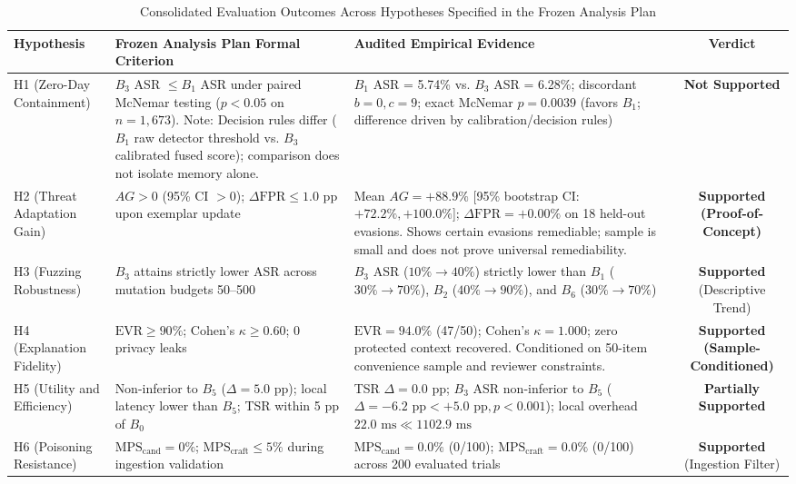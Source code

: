 \documentclass[conference]{IEEEtran}
\begin{document}
\begin{table}[t]
\centering
\caption{Consolidated Evaluation Outcomes Across Hypotheses Specified in the Frozen Analysis Plan}
\label{tab:hypotheses_summary}
\begin{tabular}{l p{5.2cm} p{7.3cm} c}
\hline
\textbf{Hypothesis} & \textbf{Frozen Analysis Plan Formal Criterion} & \textbf{Audited Empirical Evidence} & \textbf{Verdict} \\
\hline
H1 (Zero-Day Containment) & $B_3$ ASR $\le B_1$ ASR under paired McNemar testing ($p < 0.05$ on $n=1,673$). Note: Decision rules differ ($B_1$ raw detector threshold vs. $B_3$ calibrated fused score); comparison does not isolate memory alone. & $B_1$ ASR = 5.74\% vs. $B_3$ ASR = 6.28\%; discordant $b=0, c=9$; exact McNemar $p = 0.0039$ (favors $B_1$; difference driven by calibration/decision rules) & \textbf{Not Supported} \\
H2 (Threat Adaptation Gain) & $AG > 0$ (95\% CI $> 0$); $\Delta\text{FPR} \le 1.0\text{ pp}$ upon exemplar update & Mean $AG = +88.9\%$ [95\% bootstrap CI: $+72.2\%, +100.0\%$]; $\Delta\text{FPR} = +0.00\%$ on 18 held-out evasions. Shows certain evasions remediable; sample is small and does not prove universal remediability. & \textbf{Supported (Proof-of-Concept)} \\
H3 (Fuzzing Robustness) & $B_3$ attains strictly lower ASR across mutation budgets 50--500 & $B_3$ ASR ($10\% \to 40\%$) strictly lower than $B_1$ ($30\% \to 70\%$), $B_2$ ($40\% \to 90\%$), and $B_6$ ($30\% \to 70\%$) & \textbf{Supported} (Descriptive Trend) \\
H4 (Explanation Fidelity) & $\text{EVR} \ge 90\%$; Cohen's $\kappa \ge 0.60$; 0 privacy leaks & $\text{EVR} = 94.0\%$ (47/50); Cohen's $\kappa = 1.000$; zero protected context recovered. Conditioned on 50-item convenience sample and reviewer constraints. & \textbf{Supported (Sample-Conditioned)} \\
H5 (Utility and Efficiency) & Non-inferior to $B_5$ ($\Delta = 5.0\text{ pp}$); local latency lower than $B_5$; TSR within 5 pp of $B_0$ & TSR $\Delta = 0.0\text{ pp}$; $B_3$ ASR non-inferior to $B_5$ ($\Delta = -6.2\text{ pp} < +5.0\text{ pp}, p < 0.001$); local overhead $22.0\text{ ms} \ll 1102.9\text{ ms}$ & \textbf{Partially Supported} \\
H6 (Poisoning Resistance) & $\text{MPS}_{\text{cand}} = 0\%$; $\text{MPS}_{\text{craft}} \le 5\%$ during ingestion validation & $\text{MPS}_{\text{cand}} = 0.0\%$ (0/100); $\text{MPS}_{\text{craft}} = 0.0\%$ (0/100) across 200 evaluated trials & \textbf{Supported} (Ingestion Filter) \\
\hline
\end{tabular}
\end{table}
\end{document}
